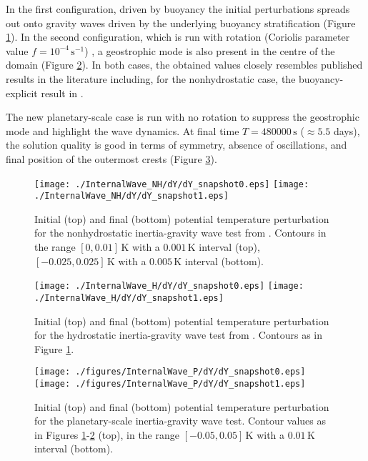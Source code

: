 \documentclass{ametsoc}
\theoremstyle{definition}
\begin{document}
In the first configuration, driven by buoyancy the initial perturbations spreads out onto gravity waves driven by the underlying buoyancy stratification (Figure \ref{fig:SK94_NH}). In the second configuration, which is run with rotation (Coriolis parameter value $f=10^{-4}\,\textrm{s}^{-1}$) , a geostrophic mode is also present in the centre of the domain (Figure \ref{fig:SK94_H}). In both cases, the obtained values closely resembles published results in the literature including, for the nonhydrostatic case, the buoyancy-explicit result in \cite{BenacchioEtAl2014}.

The new planetary-scale case is run with no rotation to suppress the geostrophic mode and highlight the wave dynamics. At final time $T=480000\,\textrm{s}$ ($\approx5.5$ days), the solution quality is good in terms of symmetry, absence of oscillations, and final position of the outermost crests (Figure \ref{fig:SK94_P}).  

\begin{figure}
\centering
 \texttt{[image: ./InternalWave\_NH/dY/dY\_snapshot0.eps]}
 \texttt{[image: ./InternalWave\_NH/dY/dY\_snapshot1.eps]}
 \caption{Initial (top) and final (bottom) potential temperature perturbation for the nonhydrostatic inertia-gravity wave test from \cite{SkamarockKlemp1994}. Contours in the range $[0, 0.01]\,\textrm{K}$ with a $0.001\,\textrm{K}$ interval (top), $[-0.025, 0.025]\,\textrm{K}$ with a $0.005\,\textrm{K}$ interval (bottom).}
 \label{fig:SK94_NH}
\end{figure}

\begin{figure}
\centering
 \texttt{[image: ./InternalWave\_H/dY/dY\_snapshot0.eps]}
 \texttt{[image: ./InternalWave\_H/dY/dY\_snapshot1.eps]}
 \caption{Initial (top) and final (bottom) potential temperature perturbation for the hydrostatic inertia-gravity wave test from \cite{SkamarockKlemp1994}. Contours as in Figure \ref{fig:SK94_NH}.}
 \label{fig:SK94_H}
 \end{figure}

\begin{figure}
\centering
 \texttt{[image: ./figures/InternalWave\_P/dY/dY\_snapshot0.eps]}
 \texttt{[image: ./figures/InternalWave\_P/dY/dY\_snapshot1.eps]}
 \caption{Initial (top) and final (bottom) potential temperature perturbation for the planetary-scale inertia-gravity wave test. Contour values as in Figures \ref{fig:SK94_NH}-\ref{fig:SK94_H} (top), in the range $[-0.05, 0.05]\,\textrm{K}$ with a $0.01\,\textrm{K}$ interval (bottom).}
  \label{fig:SK94_P}
\end{figure}
\end{document}
